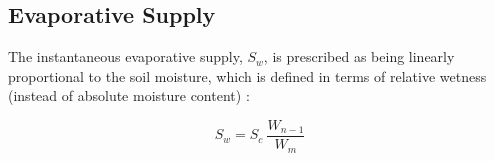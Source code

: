 \subsection{Evaporative Supply}
\label{sec:sw}
The instantaneous evaporative supply, $S_w$, is prescribed as being linearly proportional to the soil moisture, which is defined in terms of relative wetness (instead of absolute moisture content) \parencite{federer82}:

%
\begin{equation}
\label{eq:sw}
    S_w = S_c\: \frac{W_{n-1}}{W_m}
\end{equation}

